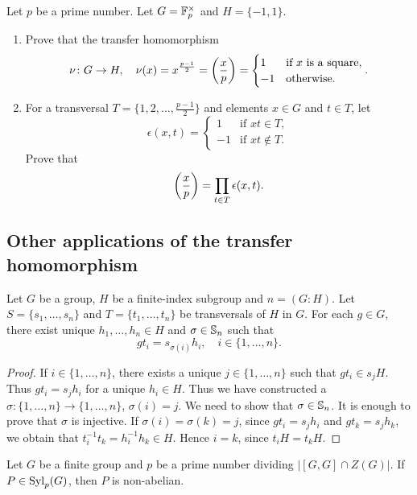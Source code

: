 \begin{exercise}
	Let $p$ be a prime number. Let $G=\mathbb{F}_p^\times$ and $H=\{-1,1\}$. 
    \begin{enumerate} 
    \item Prove that the transfer homomorphism 
	\[
		\nu\colon G\to H,\quad
		\nu(x)=x^{\frac{p-1}{2}}=\left(\frac{x}{p}\right)=\begin{cases}
			1 & \text{if $x$ is a square},\\
			-1 & \text{otherwise}.
		\end{cases}.
	\]
	\item For a transversal $T=\{1,2,\dots,\frac{p-1}{2}\}$ and elements $x\in G$ and $t\in T$, let 
 	\[
	\epsilon(x,t)=\begin{cases}
		1 & \text{if $xt\in T$},\\
		-1 & \text{if $xt\not\in T$}.
	\end{cases}
	\]
	Prove that  
	\[
	\left(\frac{x}{p}\right)=\prod_{t\in T}\epsilon(x,t).
	\]
    \end{enumerate}
\end{exercise}

\subsection{Other applications of the transfer homomorphism}

\begin{lemma}
	\label{lem:sigma}
	Let $G$ be a group, $H$ be a finite-index subgroup and $n=(G:H)$. 
    Let $S=\{s_1,\dots,s_n\}$ and $T=\{t_1,\dots,t_n\}$ be transversals of $H$ in $G$. 
    For each $g\in G$, there exist unique $h_1,\dots,h_n\in H$ and 
	$\sigma\in\mathbb{S}_n$ such that 
	\[
		gt_i=s_{\sigma(i)}h_i,\quad
		i\in\{1,\dots,n\}.
	\]
\end{lemma}

\begin{proof}
	If $i\in\{1,\dots,n\}$, there exists  a unique $j\in\{1,\dots,n\}$ such that 
    $gt_i\in
	s_jH$. Thus $gt_i=s_jh_i$ for a unique $h_i\in H$. Thus we have constructed a 
	$\sigma\colon\{1,\dots,n\}\to\{1,\dots,n\}$, $\sigma(i)=j$.  We need to show that 
	$\sigma\in\mathbb{S}_n$. It is enough to prove that $\sigma$ is injective. If
	$\sigma(i)=\sigma(k)=j$, since $gt_i=s_jh_i$ and $gt_k=s_jh_k$, we obtain that 
	$t_i^{-1}t_k=h_i^{-1}h_k\in H$. Hence $i=k$, since $t_iH=t_kH$.
\end{proof}


\begin{theorem}
	\label{thm:P_nonabelian}
	Let $G$ be a finite group and $p$ be a prime number dividing $|[G,G]\cap
	Z(G)|$. If $P\in\mathrm{Syl}_p(G)$, then $P$ is non-abelian. 
\end{theorem}

